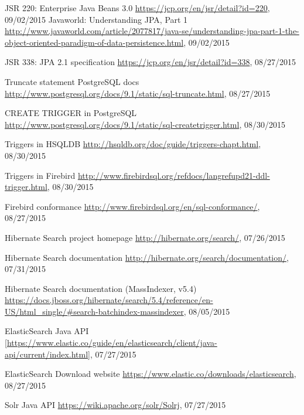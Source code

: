 %
%
\begin{thebibliography}{99}
	
	JSR 220: Enterprise Java Beans 3.0
	\url{https://jcp.org/en/jsr/detail?id=220}, 09/02/2015
	Javaworld: Understanding JPA, Part 1
	\url{http://www.javaworld.com/article/2077817/java-se/understanding-jpa-part-1-the-object-oriented-paradigm-of-data-persistence.html}, 09/02/2015
	
	JSR 338: JPA 2.1 specification
	\url{https://jcp.org/en/jsr/detail?id=338}, 08/27/2015
	
	Truncate statement PostgreSQL docs
	\url{http://www.postgresql.org/docs/9.1/static/sql-truncate.html}, 08/27/2015
	
	CREATE TRIGGER in PostgreSQL
	\url{http://www.postgresql.org/docs/9.1/static/sql-createtrigger.html}, 08/30/2015
	
	Triggers in HSQLDB
	\url{http://hsqldb.org/doc/guide/triggers-chapt.html}, 08/30/2015
	
	Triggers in Firebird
	\url{http://www.firebirdsql.org/refdocs/langrefupd21-ddl-trigger.html}, 08/30/2015
	
	Firebird conformance
	\url{http://www.firebirdsql.org/en/sql-conformance/}, 08/27/2015
	
	Hibernate Search project homepage
	\url{http://hibernate.org/search/}, 07/26/2015
	
	Hibernate Search documentation
	\url{http://hibernate.org/search/documentation/}, 07/31/2015
	
	Hibernate Search documentation (MassIndexer, v5.4)
	\url{https://docs.jboss.org/hibernate/search/5.4/reference/en-US/html_single/#search-batchindex-massindexer}, 08/05/2015
	
	ElasticSearch Java API
	\url{[https://www.elastic.co/guide/en/elasticsearch/client/java-api/current/index.html]}, 07/27/2015
	
	ElasticSearch Download website
	\url{https://www.elastic.co/downloads/elasticsearch}, 08/27/2015
	
	Solr Java API
	\url{https://wiki.apache.org/solr/Solrj}, 07/27/2015
	

\end{thebibliography}
